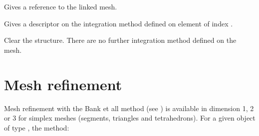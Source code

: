 \documentclass[a4paper,11pt,english]{sphinxmanual}
\begin{document}
\begin{fulllineitems}
\label{\detokenize{userdoc/binteg:mim.linked_mesh}}
Gives a reference to the linked mesh.

\end{fulllineitems}


\begin{fulllineitems}
\label{\detokenize{userdoc/binteg:mim.int_method_of_element}}
Gives a descriptor on the integration method defined on element of index .

\end{fulllineitems}


\begin{fulllineitems}
\label{\detokenize{userdoc/binteg:mim.clear}}
Clear the structure. There are no further integration method defined on the
mesh.

\end{fulllineitems}



\chapter{Mesh refinement}
\label{\detokenize{userdoc/rmesh:mesh-refinement}}\label{\detokenize{userdoc/rmesh:ud-rmesh}}\label{\detokenize{userdoc/rmesh::doc}}
Mesh refinement with the Bank et all method (see ) is available in
dimension 1, 2 or 3 for simplex meshes (segments, triangles and tetrahedrons).
For a given object  of type , the method:
\end{document}
